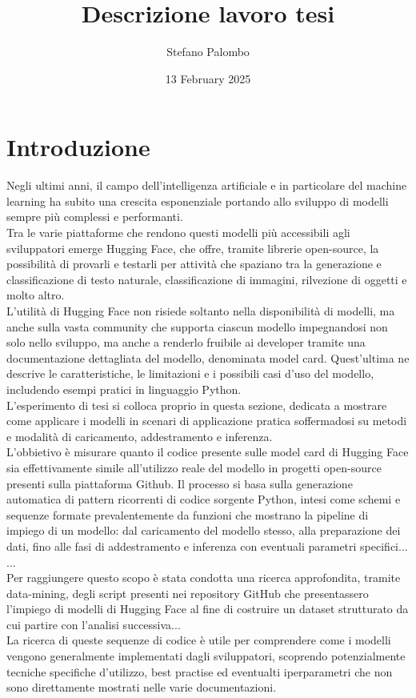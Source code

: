 \documentclass{article}
\title{Descrizione lavoro tesi}
\author{Stefano Palombo}
\date{13 February 2025}
\begin{document}
\maketitle

\section{Introduzione}
Negli ultimi anni, il campo dell'intelligenza artificiale e in particolare del machine learning ha subito una crescita esponenziale portando allo sviluppo di modelli sempre più complessi e performanti.\\
Tra le varie piattaforme che rendono questi modelli più accessibili agli sviluppatori emerge Hugging Face, che offre, tramite librerie open-source, la possibilità di provarli e testarli per attività che spaziano tra la generazione e classificazione di testo naturale, classificazione di immagini, rilvezione di oggetti e molto altro.\\
L'utilità di Hugging Face non risiede soltanto nella disponibilità di modelli, ma anche sulla vasta community che supporta ciascun modello impegnandosi non solo nello sviluppo, ma anche a renderlo fruibile ai developer tramite una documentazione dettagliata del modello, denominata model card. Quest'ultima ne descrive le caratteristiche, le limitazioni e i possibili casi d'uso del modello, includendo esempi pratici in linguaggio Python.\\
L'esperimento di tesi si colloca proprio in questa sezione, dedicata a mostrare come applicare i modelli in scenari di applicazione pratica soffermadosi su metodi e modalità di caricamento, addestramento e inferenza.\\
L'obbietivo è misurare quanto il codice presente sulle model card di Hugging Face sia effettivamente simile all'utilizzo reale del modello in progetti open-source presenti sulla piattaforma Github. Il processo si basa sulla generazione automatica di pattern ricorrenti di codice sorgente Python, intesi come schemi e sequenze formate prevalentemente da funzioni che mostrano la pipeline di impiego di un modello: dal caricamento del modello stesso, alla preparazione dei dati, fino alle fasi di addestramento e inferenza con eventuali parametri specifici...\\
...\\
Per raggiungere questo scopo è stata condotta una ricerca approfondita, tramite data-mining, degli script presenti nei repository GitHub che presentassero l'impiego di modelli di Hugging Face al fine di costruire un dataset strutturato da cui partire con l'analisi successiva...\\
La ricerca di queste sequenze di codice è utile per comprendere come i modelli vengono generalmente implementati dagli sviluppatori, scoprendo potenzialmente tecniche specifiche d'utilizzo, best practise ed eventualti iperparametri che non sono direttamente mostrati nelle varie documentazioni.
\end{document}
